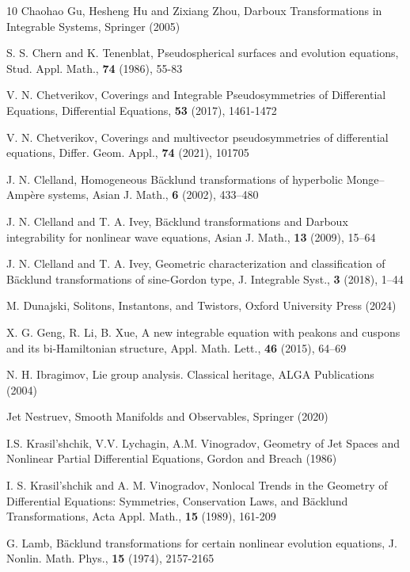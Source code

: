 \documentclass[12pt,english]{elsarticle}
\theoremstyle{plain}
\theoremstyle{plain}
\theoremstyle{remark}
\theoremstyle{plain}
\theoremstyle{definition}
\theoremstyle{definition}
\begin{document}
\begin{thebibliography}{10}
Chaohao Gu, Hesheng Hu and Zixiang Zhou, Darboux Transformations
in Integrable Systems, Springer (2005)

 S. S. Chern and K. Tenenblat, Pseudospherical surfaces
and evolution equations, Stud. Appl. Math., \textbf{74} (1986), 55-83

V. N. Chetverikov, Coverings and Integrable Pseudosymmetries
of Differential Equations, Differential Equations, \textbf{53} (2017),
1461-1472 

V. N. Chetverikov, Coverings and multivector pseudosymmetries
of differential equations, Differ. Geom. Appl., \textbf{74} (2021),
101705

J. N. Clelland, Homogeneous Bäcklund transformations
of hyperbolic Monge--Ampère systems, Asian J. Math., \textbf{6} (2002),
433--480

 J. N. Clelland and T. A. Ivey, Bäcklund transformations
and Darboux integrability for nonlinear wave equations, Asian J. Math.,
\textbf{13} (2009), 15--64

J. N. Clelland and T. A. Ivey, Geometric characterization
and classification of Bäcklund transformations of sine-Gordon type,
J. Integrable Syst., \textbf{3} (2018), 1--44

M. Dunajski, Solitons, Instantons, and Twistors, Oxford
University Press (2024)

X. G. Geng, R. Li, B. Xue, A new integrable equation
with peakons and cuspons and its bi-Hamiltonian structure, Appl. Math.
Lett., \textbf{46} (2015), 64--69


N. H. Ibragimov, Lie group analysis. Classical
heritage, ALGA Publications (2004)

Jet Nestruev, Smooth Manifolds and Observables, Springer
(2020)

I.S. Krasil'shchik, V.V. Lychagin, A.M. Vinogradov,
Geometry of Jet Spaces and Nonlinear Partial Differential Equations,
Gordon and Breach (1986)

I. S. Krasil'shchik and A. M. Vinogradov, Nonlocal
Trends in the Geometry of Differential Equations: Symmetries, Conservation
Laws, and Bäcklund Transformations, Acta Appl. Math., \textbf{15}
(1989), 161-209

G. Lamb, Bäcklund transformations for certain nonlinear
evolution equations, J. Nonlin. Math. Phys., \textbf{15} (1974), 2157-2165


\end{thebibliography}
\end{document}
